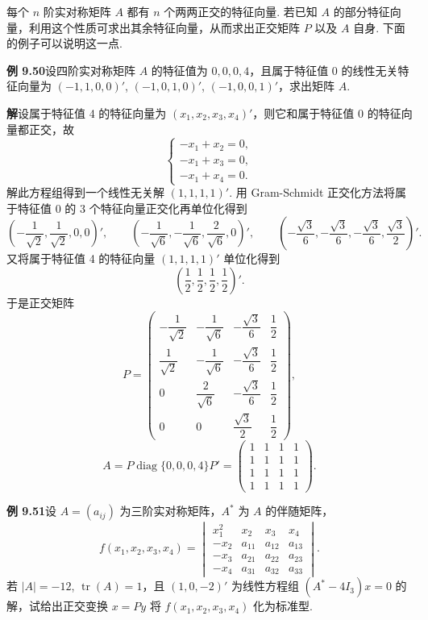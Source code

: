 \documentclass[UTF8, 12pt, fontset=fandol, oneside]{ctexart}
\begin{document}
每个 $n$ 阶实对称矩阵 $A$ 都有 $n$ 个两两正交的特征向量. 若已知 $A$ 的部分特征向量，利用这个性质可求出其余特征向量，从而求出正交矩阵 $P$ 以及 $A$ 自身. 下面的例子可以说明这一点.

\noindent\textbf{例 9.50}\quad 设四阶实对称矩阵 $A$ 的特征值为 $0,0,0,4$，且属于特征值 0 的线性无关特征向量为 $(-1,1,0,0)'$, $(-1,0,1,0)'$, $(-1,0,0,1)'$，求出矩阵 $A$.

\noindent\textbf{解}\quad 设属于特征值 4 的特征向量为 $(x_1,x_2,x_3,x_4)'$，则它和属于特征值 0 的特征向量都正交，故
\[
\begin{cases}
-x_1+x_2=0,\\
-x_1+x_3=0,\\
-x_1+x_4=0.
\end{cases}
\]
解此方程组得到一个线性无关解 $(1,1,1,1)'$. 用 Gram-Schmidt 正交化方法将属于特征值 0 的 3 个特征向量正交化再单位化得到
\[
\left(-\frac1{\sqrt2},\frac1{\sqrt2},0,0\right)',\qquad
\left(-\frac1{\sqrt6},-\frac1{\sqrt6},\frac2{\sqrt6},0\right)',\qquad
\left(-\frac{\sqrt3}6,-\frac{\sqrt3}6,-\frac{\sqrt3}6,\frac{\sqrt3}2\right)'.
\]
又将属于特征值 4 的特征向量 $(1,1,1,1)'$ 单位化得到
\[
\left(\frac12,\frac12,\frac12,\frac12\right)'.
\]
于是正交矩阵
\[
P=\begin{pmatrix}
-\dfrac1{\sqrt2}&-\dfrac1{\sqrt6}&-\dfrac{\sqrt3}6&\dfrac12\\
\dfrac1{\sqrt2}&-\dfrac1{\sqrt6}&-\dfrac{\sqrt3}6&\dfrac12\\
0&\dfrac2{\sqrt6}&-\dfrac{\sqrt3}6&\dfrac12\\
0&0&\dfrac{\sqrt3}2&\dfrac12
\end{pmatrix},
\]
\[
A=P\operatorname{diag}\{0,0,0,4\}P'=
\begin{pmatrix}
1&1&1&1\\
1&1&1&1\\
1&1&1&1\\
1&1&1&1
\end{pmatrix}.
\]

\noindent\textbf{例 9.51}\quad 设 $A=(a_{ij})$ 为三阶实对称矩阵，$A^*$ 为 $A$ 的伴随矩阵，
\[
f(x_1,x_2,x_3,x_4)=
\begin{vmatrix}
x_1^2&x_2&x_3&x_4\\
-x_2&a_{11}&a_{12}&a_{13}\\
-x_3&a_{21}&a_{22}&a_{23}\\
-x_4&a_{31}&a_{32}&a_{33}
\end{vmatrix}.
\]
若 $|A|=-12$, $\operatorname{tr}(A)=1$，且 $(1,0,-2)'$ 为线性方程组 $(A^*-4I_3)x=0$ 的解，试给出正交变换 $x=Py$ 将 $f(x_1,x_2,x_3,x_4)$ 化为标准型.
\end{document}
